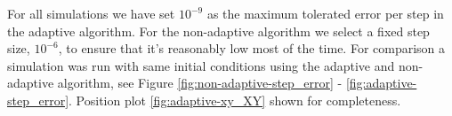 For all simulations we have set $10^{-9}$ as the maximum tolerated error per step in the adaptive algorithm. For the non-adaptive algorithm we select a fixed step size, $10^{-6}$, to ensure that it's reasonably low most of the time. For comparison a simulation was run with same initial conditions using the adaptive and non-adaptive algorithm, see Figure \ref{fig:non-adaptive-step_error} - \ref{fig:adaptive-step_error}. Position plot \ref{fig:adaptive-xy_XY} shown for completeness.

\begin{figure}
    \centering
\end{figure}

